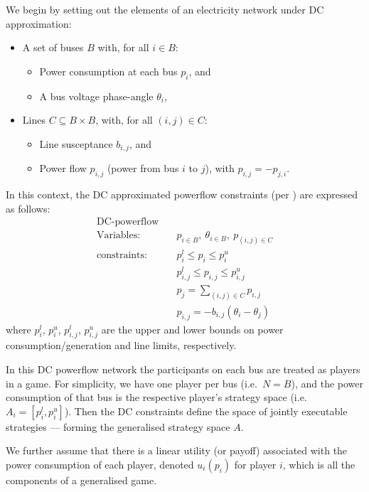 \documentclass[
10pt, %
a4paper, %
oneside, %
headinclude,footinclude, %
BCOR5mm, %
]{scrartcl}
\begin{document}
We begin by setting out the elements of an electricity network under DC approximation:
\begin{itemize}
    \item A set of buses $B$ with, for all $i\in B$:
    \begin{itemize} 
        \item Power consumption at each bus $p_i$, and 
        \item A bus voltage phase-angle $\theta_i$,
    \end{itemize}
    \item Lines $C\subseteq B\times B$, with, for all $(i,j)\in C$: 
        \begin{itemize} 
        \item Line susceptance $b_{i,j}$, and 
        \item Power flow $p_{i,j}$ (power from bus $i$ to $j$), with $p_{i,j}=-p_{j,i}$. 
    \end{itemize}
\end{itemize}
In this context, the DC approximated powerflow constraints (per \cite{Wang1}) are expressed as follows:
\begin{equation}
\label{dcopf1}
\begin{aligned}
\text{DC-powerflow} \quad& \\
\text{Variables:} \quad&  p_{i\in B},\ \theta_{i\in B},\ p_{(i,j)\in C} \\
\text{constraints:} \quad& p_i^{l}\le p_i \le p_i^{u} \\
&p_{i,j}^l \le p_{i,j} \le p_{i,j}^u \\
&p_j = \sum_{(i,j)\in C}p_{i,j}\\
&p_{i,j} = -b_{i,j}(\theta_i - \theta_j)
\end{aligned}
\end{equation}
where $p_i^{l}$, $p_i^{u}$, $p_{i,j}^l$, $p_{i,j}^u$ are the upper and lower bounds on power consumption/generation and line limits, respectively.

In this DC powerflow network the participants on each bus are treated as players in a game.
For simplicity, we have one player per bus (i.e.~$N=B$), and the power consumption of that bus is the respective player's strategy space (i.e.\ $A_i=[p_i^l,p_i^u]$).
Then the DC constraints define the space of jointly executable strategies --- forming the generalised strategy space $A$.

We further assume that there is a linear utility (or payoff) associated with the power consumption of each player, denoted $u_i(p_i)$ for player $i$, which is all the components of a generalised game.
\end{document}
